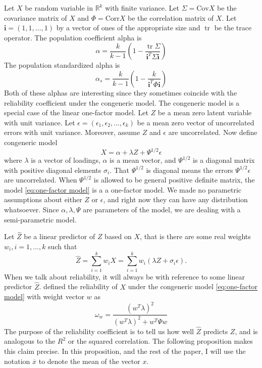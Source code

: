 \documentclass{article}
\theoremstyle{plain}
\theoremstyle{plain}
\theoremstyle{definition}
\theoremstyle{remark}
\theoremstyle{definition}
\theoremstyle{plain}
\theoremstyle{plain}
\theoremstyle{definition}
\DeclareMathOperator{\tr}{tr}
\begin{document}
Let $X$ be random variable in $\mathbb{R}^{k}$ with finite variance.
Let $\Sigma=\textrm{Cov}X$ be the covariance matrix of $X$ and $\Phi=\textrm{Corr}X$
be the correlation matrix of $X$. Let $\mathbf{i}=\left(1,1,\ldots,1\right)$ by a vector of ones of the appropriate size and $\tr$ be the trace operator.
The population coefficient alpha \citep[][eq. 2]{cronbach1951coefficient} is
\begin{equation}
\alpha =  \frac{k}{k-1}\left(1-\frac{\tr\Sigma}{\mathbf{i}^{T}\Sigma\mathbf{i}}\right)\label{eq:Coefficient alpha}
\end{equation}
The population standardized alpha \citep[][eq. 2]{Falk2011-ae} is
\begin{equation}
\alpha_s=\frac{k}{k-1}\left(1-\frac{k}{\mathbf{i}^{T}\Phi\mathbf{i}}\right)\label{eq:standardized alpha}
\end{equation}
Both of these alphas are interesting since they sometimes coincide with the reliability coefficient under the congeneric model. 
The congeneric model is a special case of the linear one-factor model. Let $Z$ be a mean zero latent variable with unit variance. Let $\epsilon=\left(\epsilon_{1},\epsilon_{2},\ldots,\epsilon_{k}\right)$
be a mean zero vector of uncorrelated errors with unit variance. Moreover, assume $Z$ and $\epsilon$ are uncorrelated. Now define congeneric model
\begin{equation}
X=\alpha + \lambda Z+\Psi^{1/2}\epsilon\label{eq:one-factor model}
\end{equation}
where $\lambda$ is a vector of loadings, $\alpha$ is a mean vector, and $\Psi^{1/2}$ is a diagonal matrix with positive diagonal elements $\sigma_i$. That $\Psi^{1/2}$ is diagonal means the errors $\Psi^{1/2}\epsilon$ are uncorrelated. When $\Psi^{1/2}$ is allowed to be general positive definite matrix, the model \eqref{eq:one-factor model} is a a one-factor model. We made no parametric assumptions about either $Z$ or $\epsilon$, and right now they can have any distribution whatsoever. Since $\alpha,\lambda,\Psi$ are parameters of the model, we are dealing with a semi-parametric model.

Let $\widehat{Z}$ be a linear predictor of $Z$ based on $X$, that
is there are some real weights $w_{i},i=1,\ldots,k$ such that
\begin{equation}
\label{eq:Linear predictor}
\widehat{Z} =  \sum_{i=1}^{k}w_{i}X =  \sum_{i=1}^{k}w_{i}\left(\lambda Z+\sigma_{i}\epsilon\right).\nonumber 
\end{equation}
When we talk about reliability, it will always be with reference to some linear predictor $\widehat{Z}$. \citet[][p. 112]{Joreskog1971-nn} defined the reliability of $X$ under the congeneric model \eqref{eq:one-factor model} with weight vector $w$ as 
\begin{equation}
\label{eq:linear reliabiltiy}
\omega_w = \frac{(w^T\lambda)^2}{(w^T\lambda)^2 + w^T \Psi w}
\end{equation}
The purpose of the reliability coefficient is to tell us how well $\widehat{Z}$ predicts $Z$, and is analogous to the $R^2$ or the squared correlation. The following proposition makes this claim precise. In this proposition, and the rest of the paper, I will use the notation $\overline{x}$ to denote the mean of the vector $x$.
\end{document}

